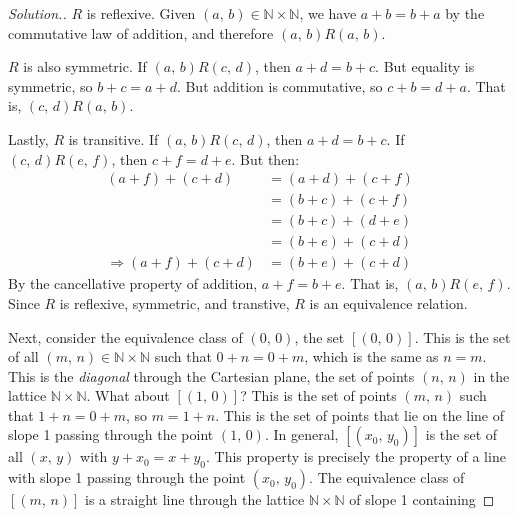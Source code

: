 \documentclass{article}
\theoremstyle{normal}
\begin{document}
    \color{black}
    \begin{proof}[Solution.]
        $R$ is reflexive. Given $(a,\,b)\in\mathbb{N}\times\mathbb{N}$, we have
        $a+b=b+a$ by the commutative law of addition, and therefore
        $(a,\,b)R(a,\,b)$.
        \par\hfill\par
        $R$ is also symmetric. If $(a,\,b)R(c,\,d)$, then
        $a+d=b+c$. But equality is symmetric, so $b+c=a+d$. But addition is
        commutative, so $c+b=d+a$. That is, $(c,\,d)R(a,\,b)$.
        \par\hfill\par
        Lastly, $R$ is transitive. If $(a,\,b)R(c,\,d)$, then $a+d=b+c$.
        If $(c,\,d)R(e,\,f)$, then $c+f=d+e$. But then:
        \begin{align}
            (a+f)+(c+d)
            &=(a+d)+(c+f)\tag{Associativity and Commutativity}\\
            &=(b+c)+(c+f)\tag{Substitution}\\
            &=(b+c)+(d+e)\tag{Substitution}\\
            &=(b+e)+(c+d)\tag{Associativity and Commutativity}\\
            \Rightarrow(a+f)+(c+d)&=(b+e)+(c+d)
            \tag{Transitivity of Equality}
        \end{align}
        By the cancellative property of addition, $a+f=b+e$. That is,
        $(a,\,b)R(e,\,f)$. Since $R$ is reflexive, symmetric, and transtive,
        $R$ is an equivalence relation.
        \par\hfill\par
        Next, consider the equivalence class of $(0,\,0)$, the set
        $[(0,\,0)]$. This is the set of all
        $(m,\,n)\in\mathbb{N}\times\mathbb{N}$ such that
        $0+n=0+m$, which is the same as $n=m$. This is the \textit{diagonal}
        through the Cartesian plane, the set of points $(n,\,n)$ in the lattice
        $\mathbb{N}\times\mathbb{N}$. What about $[(1,\,0)]$? This is the set
        of points $(m,\,n)$ such that $1+n=0+m$, so $m=1+n$. This is the set
        of points that lie on the line of slope 1 passing through the point
        $(1,\,0)$. In general, $[(x_{0},\,y_{0})]$ is the set of all $(x,\,y)$
        with $y+x_{0}=x+y_{0}$. This property is precisely the property of a
        line with slope 1 passing through the point $(x_{0},\,y_{0})$. The
        equivalence class of $[(m,\,n)]$ is a straight line through the
        lattice $\mathbb{N}\times\mathbb{N}$ of slope 1 containing

\end{proof}
\end{document}
